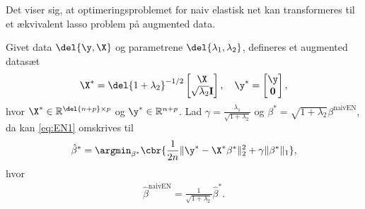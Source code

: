 %
%
%
Det viser sig, at optimeringsproblemet for naiv elastisk net kan transformeres til et ækvivalent lasso problem på augmented data.
%
\begin{lem} \label{lem:elastisk_net}
Givet data \(\del{\y, \X}\) og parametrene \(\del{\lambda_1, \lambda_2}\), defineres et augmented datasæt 
\begin{align*}
\X^* = \del{1 + \lambda_2}^{-1/2} \begin{bmatrix}
\X \\ \sqrt{\lambda_2} \mathbf{I}
\end{bmatrix}, \quad \y^* = \begin{bmatrix}
\y \\ \mathbf{0}
\end{bmatrix},
\end{align*}
hvor \(\X^* \in \mathbb{R}^{\del{n+p} \times p}\) og \(\y^* \in \mathbb{R}^{n+p}\).
Lad \(\gamma = \frac{\lambda_1}{\sqrt{1+\lambda_2}}\) og \(\beta^* = \sqrt{1+\lambda_2} \beta^\text{naivEN}\), da kan \eqref{eq:EN1} omskrives til
\begin{align}
\hat{\beta}^* = \argmin_{\beta^*} \cbr{\frac{1}{2n} \Vert \y^* - \X^* \beta^* \Vert_2^2 +\gamma \Vert \beta^* \Vert_1}, \label{eq:EN11}
\end{align}
hvor
\begin{align*}
\hat{\beta}^\text{naivEN} = \frac{1}{\sqrt{1+\lambda_2}} \hat{\beta}^*.
\end{align*}
\end{lem}
